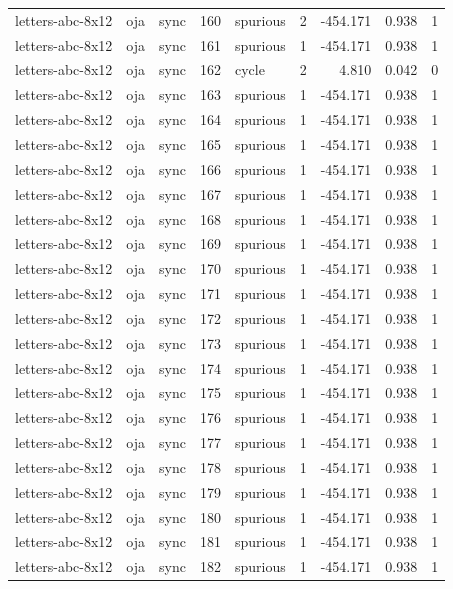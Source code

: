\begin{tabular}{lllrlrrrr}
letters-abc-8x12 & oja & sync & 160 & spurious & 2 & -454.171 & 0.938 & 1 \\
letters-abc-8x12 & oja & sync & 161 & spurious & 1 & -454.171 & 0.938 & 1 \\
letters-abc-8x12 & oja & sync & 162 & cycle & 2 & 4.810 & 0.042 & 0 \\
letters-abc-8x12 & oja & sync & 163 & spurious & 1 & -454.171 & 0.938 & 1 \\
letters-abc-8x12 & oja & sync & 164 & spurious & 1 & -454.171 & 0.938 & 1 \\
letters-abc-8x12 & oja & sync & 165 & spurious & 1 & -454.171 & 0.938 & 1 \\
letters-abc-8x12 & oja & sync & 166 & spurious & 1 & -454.171 & 0.938 & 1 \\
letters-abc-8x12 & oja & sync & 167 & spurious & 1 & -454.171 & 0.938 & 1 \\
letters-abc-8x12 & oja & sync & 168 & spurious & 1 & -454.171 & 0.938 & 1 \\
letters-abc-8x12 & oja & sync & 169 & spurious & 1 & -454.171 & 0.938 & 1 \\
letters-abc-8x12 & oja & sync & 170 & spurious & 1 & -454.171 & 0.938 & 1 \\
letters-abc-8x12 & oja & sync & 171 & spurious & 1 & -454.171 & 0.938 & 1 \\
letters-abc-8x12 & oja & sync & 172 & spurious & 1 & -454.171 & 0.938 & 1 \\
letters-abc-8x12 & oja & sync & 173 & spurious & 1 & -454.171 & 0.938 & 1 \\
letters-abc-8x12 & oja & sync & 174 & spurious & 1 & -454.171 & 0.938 & 1 \\
letters-abc-8x12 & oja & sync & 175 & spurious & 1 & -454.171 & 0.938 & 1 \\
letters-abc-8x12 & oja & sync & 176 & spurious & 1 & -454.171 & 0.938 & 1 \\
letters-abc-8x12 & oja & sync & 177 & spurious & 1 & -454.171 & 0.938 & 1 \\
letters-abc-8x12 & oja & sync & 178 & spurious & 1 & -454.171 & 0.938 & 1 \\
letters-abc-8x12 & oja & sync & 179 & spurious & 1 & -454.171 & 0.938 & 1 \\
letters-abc-8x12 & oja & sync & 180 & spurious & 1 & -454.171 & 0.938 & 1 \\
letters-abc-8x12 & oja & sync & 181 & spurious & 1 & -454.171 & 0.938 & 1 \\
letters-abc-8x12 & oja & sync & 182 & spurious & 1 & -454.171 & 0.938 & 1 \\

\end{tabular}
